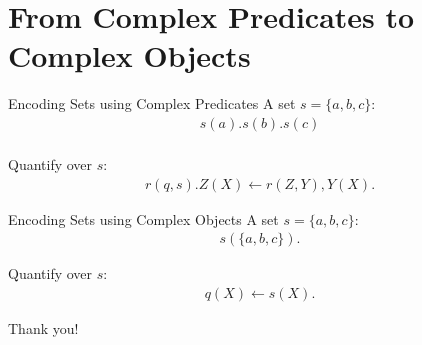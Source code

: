 \documentclass[smaller, dvipsnames]{beamer}
\begin{document}
\section{From Complex Predicates to Complex Objects}

\begin{frame}{Encoding Sets using Complex Predicates}
	A set \(s = \{ a, b, c \}\):
    \begin{align*}
    	s(a). s(b). s(c) \\
    \end{align*}

	Quantify over \(s\):
	\begin{align*}
		r(q,s).
		Z(X) \leftarrow r(Z,Y), Y(X).
	\end{align*}
\end{frame}

\begin{frame}{Encoding Sets using Complex Objects}
	A set \(s = \{ a, b, c \}\):
    \begin{align*}
    	s(\{a, b, c\}).
    \end{align*}

	Quantify over \(s\):
	\begin{align*}
		q(X) \leftarrow s(X).
	\end{align*}
\end{frame}

\begin{frame}[standout]
    Thank you!
\end{frame}
\end{document}
